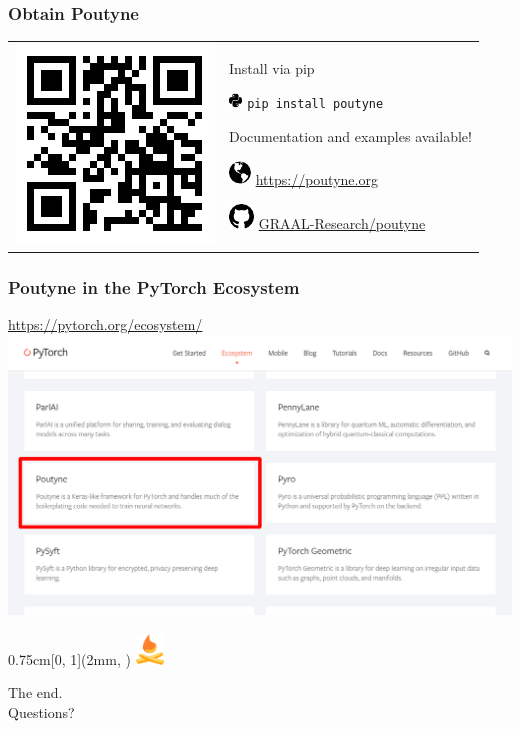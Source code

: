 \documentclass[french,english,usenames,dvipsnames]{beamer}
\def\addlogo{
    \begin{textblock*}{0.75cm}[0, 1](2mm, \paperheight-2mm)
    {\transparent{0.4}\includegraphics[width=0.75cm]{logo-notext.pdf}}
    \end{textblock*}
}
\begin{document}
    \begin{frame}
        \frametitle{Obtain Poutyne}
        \begin{tabular}[t]{m{} m{}}
            \includegraphics[trim=6mm 0mm 0mm 0mm,scale=0.5]{figures/qrcode.png}
            &

            Install via pip\par
            \includegraphics[height=1.1em]{figures/python.pdf} \texttt{pip install poutyne}\par\vspace{5mm}
            Documentation and examples available!\par
            \includegraphics[]{figures/globe.pdf} \url{https://poutyne.org}\par
            \includegraphics[]{figures/github.pdf} \href{https://github.com/GRAAL-Research/poutyne}{GRAAL-Research/poutyne}
        \end{tabular}
    \end{frame}

    \begin{frame}
        \frametitle{Poutyne in the PyTorch Ecosystem}
        \begin{center}
            \url{https://pytorch.org/ecosystem/}
            \includegraphics[scale=0.20]{pytorch_ecosystem}
        \end{center}
    \end{frame}

    \begin{frame}[nonum]
        \addlogo
        \begin{center}
            {\Huge The end.\\[2cm] Questions?}
        \end{center}
    \end{frame}
\end{document}
